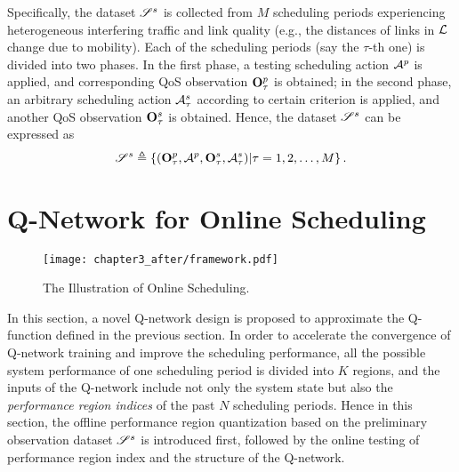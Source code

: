 Specifically, the dataset $\mathscr{S}^{s}$ is collected from $M$ scheduling periods experiencing heterogeneous interfering traffic and link quality (e.g., the distances of links in $\mathcal{L}$ change due to mobility). Each of the scheduling periods (say the $\tau$-th one) is divided into two phases. In the first phase, a testing scheduling action $\mathcal{A}^{p}$ is applied, and corresponding QoS observation $\mathbf{O}^{p}_\tau$ is obtained; in the second phase, an arbitrary scheduling action $\mathcal{A}^{s}_{\tau}$ according to certain criterion is applied, and another QoS observation $\mathbf{O}^{s}_{\tau}$ is obtained. Hence,  the dataset $\mathscr{S}^{s}$  can be expressed as
\begin{equation}
    \mathscr{S}^{s} \triangleq
    \left\{
    (\mathbf{O}^{p}_\tau, \mathcal{A}^{p}, \mathbf{O}^{s}_{\tau}, \mathcal{A}^{s}_{\tau})
    | \tau = 1, 2, \ldots, M
    \right\}.
\end{equation}

\section{Q-Network for Online Scheduling}
\begin{figure}[!t]
   \centering
   \texttt{[image: chapter3\_after/framework.pdf]}
   \caption{The Illustration of {\algName} Online Scheduling.}
   \label{fig:framework}
\end{figure}

In this section, a novel Q-network design is proposed to approximate the Q-function defined in the previous section.
In order to accelerate the convergence of Q-network training and improve the scheduling performance, all the possible system performance of one scheduling period is divided into $K$ regions, and the inputs of the Q-network include not only the system state but also the \emph{performance region indices} of the past $N$ scheduling periods. 
Hence in this section, the offline performance region quantization based on the preliminary observation dataset $\mathscr{S}^{s}$ is introduced first, followed by the online testing of performance region index and the structure of the Q-network.

